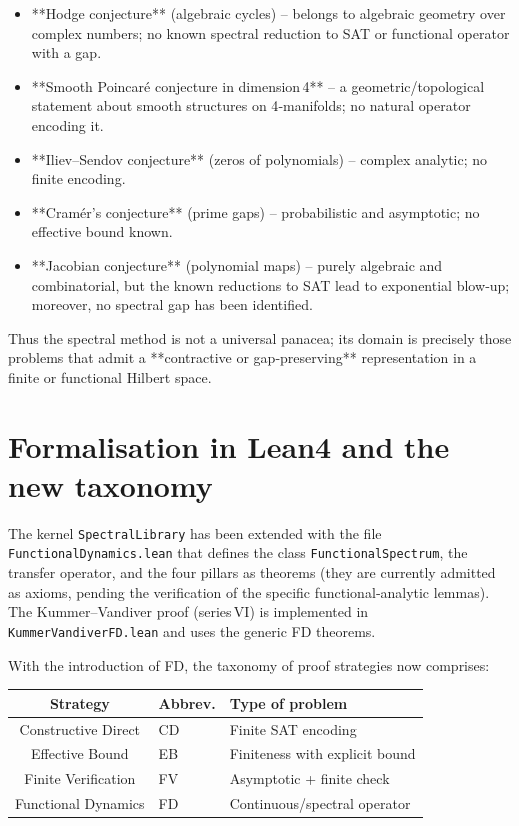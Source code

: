 \documentclass[11pt,a4paper]{article}
\begin{document}
\begin{itemize}
\item **Hodge conjecture** (algebraic cycles) – belongs to algebraic geometry over complex numbers; no known spectral reduction to SAT or functional operator with a gap.
\item **Smooth Poincaré conjecture in dimension 4** – a geometric/topological statement about smooth structures on 4‑manifolds; no natural operator encoding it.
\item **Iliev–Sendov conjecture** (zeros of polynomials) – complex analytic; no finite encoding.
\item **Cramér’s conjecture** (prime gaps) – probabilistic and asymptotic; no effective bound known.
\item **Jacobian conjecture** (polynomial maps) – purely algebraic and combinatorial, but the known reductions to SAT lead to exponential blow‑up; moreover, no spectral gap has been identified.
\end{itemize}

Thus the spectral method is not a universal panacea; its domain is precisely those problems that admit a **contractive or gap‑preserving** representation in a finite or functional Hilbert space.

\section{Formalisation in Lean4 and the new taxonomy}

The kernel \texttt{SpectralLibrary} has been extended with the file \texttt{FunctionalDynamics.lean} that defines the class \texttt{FunctionalSpectrum}, the transfer operator, and the four pillars as theorems (they are currently admitted as axioms, pending the verification of the specific functional‑analytic lemmas). The Kummer–Vandiver proof (series VI) is implemented in \texttt{KummerVandiverFD.lean} and uses the generic FD theorems.

With the introduction of FD, the taxonomy of proof strategies now comprises:

\begin{center}
\begin{tabular}{@{}cll@{}}
\toprule
Strategy & Abbrev. & Type of problem \\
\midrule
Constructive Direct & CD & Finite SAT encoding \\
Effective Bound & EB & Finiteness with explicit bound \\
Finite Verification & FV & Asymptotic + finite check \\
Functional Dynamics & FD & Continuous/spectral operator \\
\bottomrule
\end{tabular}
\end{center}
\end{document}

